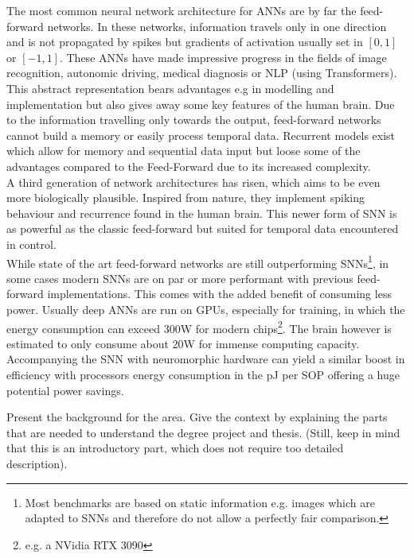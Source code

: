 The most common neural network architecture for \acp{ANN} are by far the feed-forward networks.
In these networks, information travels only in one direction and is not propagated by spikes but gradients of activation usually set in $[0,1]$ or $[-1,1]$.
These \acp{ANN} have made impressive progress in the fields of image recognition, autonomic driving, medical diagnosis\cite{patel_applications_2007} or  \ac{NLP} (using Transformers\cite{vaswani_attention_2017}).\\
This abstract representation bears advantages e.g in modelling and implementation but also gives away some key features of the human brain. Due to the information travelling only towards the output, feed-forward networks cannot build a memory or easily process temporal data. Recurrent models exist which allow for memory \cite{hutchison_biologically_2004} and sequential data input but loose some of the advantages compared to the Feed-Forward due to its increased complexity.\\
A third generation\cite{maass_networks_1997} of network architectures has risen, which aims to be even more biologically plausible. Inspired from nature, they implement spiking behaviour and recurrence found in the human brain.
This newer form of \ac{SNN} is as powerful as the classic feed-forward but suited for temporal data encountered in control.\\
While state of the art feed-forward networks are still outperforming \acp{SNN}\footnote{Most benchmarks are based on static information e.g. images which are adapted to \acp{SNN} and therefore do not allow a perfectly fair comparison.}, in some cases modern \acp{SNN} are on par\cite{lee_training_2016} or more performant with previous feed-forward implementations. This comes with the added benefit of consuming less power. Usually deep \acp{ANN} are run on \acp{GPU}, especially for training, in which the energy consumption can exceed 300W for modern chips\footnote{e.g. a NVidia RTX 3090}. The brain however is estimated to only consume about
20W \cite{clarke_circulation_1999} for immense computing capacity. Accompanying the \ac{SNN} with neuromorphic hardware can yield a similar boost in efficiency with processors energy consumption in the pJ per \ac{SOP}\cite{indiveri_importance_2019} offering a huge potential power savings.




Present the background for the area. Give the context by explaining the parts that are needed to understand the degree project and thesis. (Still, keep in mind that this is an introductory part, which does not require too detailed description).

